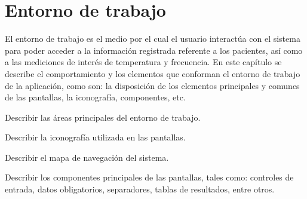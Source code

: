 
\section{Entorno de trabajo}

    El entorno de trabajo es el medio por el cual el usuario interactúa con el sistema para poder acceder a la información registrada referente a los pacientes, así como a las mediciones de interés de temperatura y frecuencia. En este capítulo se describe el comportamiento y los elementos que conforman el entorno de 
    trabajo de la aplicación, como son: la disposición de los elementos principales y comunes de las pantallas, la iconografía, componentes, etc. \bigskip

    \begin{objetivos}
      \item Describir las áreas principales del entorno de trabajo.
      \item Describir la iconografía utilizada en las pantallas.
      \item Describir el mapa de navegación del sistema.
      \item Describir los componentes principales de las pantallas, tales como: controles de entrada, datos obligatorios, separadores, tablas de resultados, entre otros.
    \end{objetivos}
\\\\\\\\\\\\\\\\
\pagebreak
{}
\pagebreak
{}
\pagebreak
{}